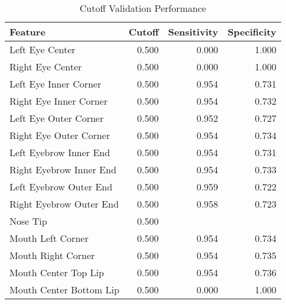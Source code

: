 \begin{table}[ht]
\centering
\caption{Cutoff Validation Performance} 
\label{tab:logistic_cutoff_table}
\begin{tabular}{lrrr}
  \hline
Feature & Cutoff & Sensitivity & Specificity \\ 
  \hline
Left Eye Center & 0.500 & 0.000 & 1.000 \\ 
  Right Eye Center & 0.500 & 0.000 & 1.000 \\ 
  Left Eye Inner Corner & 0.500 & 0.954 & 0.731 \\ 
  Right Eye Inner Corner & 0.500 & 0.954 & 0.732 \\ 
  Left Eye Outer Corner & 0.500 & 0.952 & 0.727 \\ 
  Right Eye Outer Corner & 0.500 & 0.954 & 0.734 \\ 
  Left Eyebrow Inner End & 0.500 & 0.954 & 0.731 \\ 
  Right Eyebrow Inner End & 0.500 & 0.954 & 0.733 \\ 
  Left Eyebrow Outer End & 0.500 & 0.959 & 0.722 \\ 
  Right Eyebrow Outer End & 0.500 & 0.958 & 0.723 \\ 
  Nose Tip & 0.500 &  &  \\ 
  Mouth Left Corner & 0.500 & 0.954 & 0.734 \\ 
  Mouth Right Corner & 0.500 & 0.954 & 0.735 \\ 
  Mouth Center Top Lip & 0.500 & 0.954 & 0.736 \\ 
  Mouth Center Bottom Lip & 0.500 & 0.000 & 1.000 \\ 
   \hline
\end{tabular}
\end{table}
